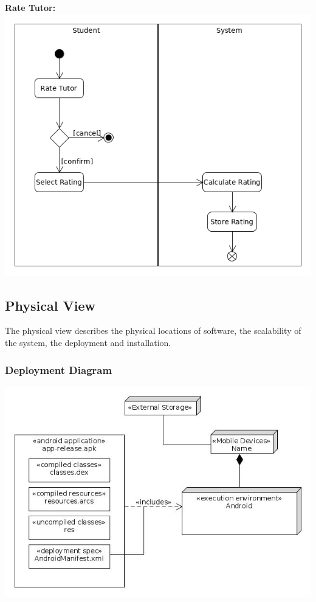 \documentclass[12pt]{article}
\begin{document}
\\\\\textbf{Rate Tutor:}\\
\includegraphics[width=140mm]{./activity_diagram/rate_tutor.png}

\subsection{Physical View}
The physical view describes the physical locations of software, the scalability of the system, the deployment and installation.
\subsubsection{Deployment Diagram}

\includegraphics[width=140mm]{./Deployment.jpg}
\end{document}
